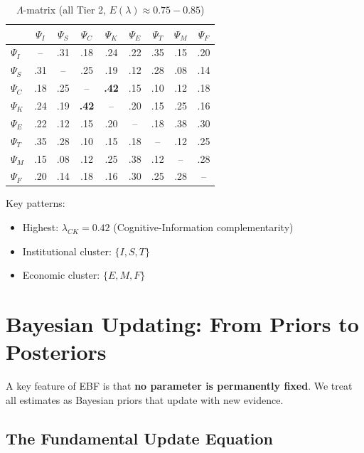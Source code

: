 \documentclass[11pt,a4paper]{article}
\theoremstyle{definition}
\begin{document}
\begin{table}[h]
\centering
\small
\begin{tabular}{l|cccccccc}
& $\Psi_I$ & $\Psi_S$ & $\Psi_C$ & $\Psi_K$ & $\Psi_E$ & $\Psi_T$ & $\Psi_M$ & $\Psi_F$ \\
\hline
$\Psi_I$ & -- & .31 & .18 & .24 & .22 & .35 & .15 & .20 \\
$\Psi_S$ & .31 & -- & .25 & .19 & .12 & .28 & .08 & .14 \\
$\Psi_C$ & .18 & .25 & -- & \textbf{.42} & .15 & .10 & .12 & .18 \\
$\Psi_K$ & .24 & .19 & \textbf{.42} & -- & .20 & .15 & .25 & .16 \\
$\Psi_E$ & .22 & .12 & .15 & .20 & -- & .18 & .38 & .30 \\
$\Psi_T$ & .35 & .28 & .10 & .15 & .18 & -- & .12 & .25 \\
$\Psi_M$ & .15 & .08 & .12 & .25 & .38 & .12 & -- & .28 \\
$\Psi_F$ & .20 & .14 & .18 & .16 & .30 & .25 & .28 & -- \\
\end{tabular}
\caption{$\Lambda$-matrix (all Tier 2, $E(\lambda) \approx 0.75-0.85$)}
\label{tab:lambda-dictionary}
\end{table}

Key patterns:
\begin{itemize}
    \item Highest: $\lambda_{CK} = 0.42$ (Cognitive-Information complementarity)
    \item Institutional cluster: $\{I, S, T\}$
    \item Economic cluster: $\{E, M, F\}$
\end{itemize}


\section{Bayesian Updating: From Priors to Posteriors}
\label{sec:bbb-updating}

A key feature of EBF is that \textbf{no parameter is permanently fixed}. 
We treat all estimates as Bayesian priors that update with new evidence.

\subsection{The Fundamental Update Equation}
\end{document}
